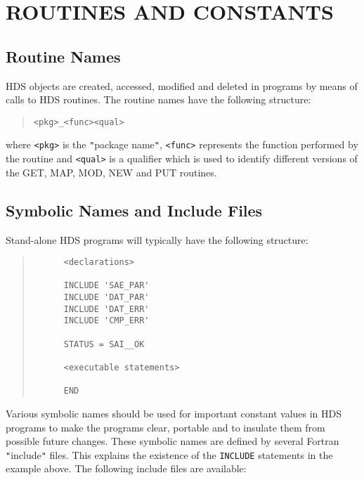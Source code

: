 \documentclass[11pt]{article}
\newcommand{\htmlref}[2]{#1}
\newcommand{\xlabel}[1]{}
\newcommand{\hi}[1]{{\tt{#1}}}
\newcommand{\qt}[1]{``#1''}
\renewcommand{\qt}[1]{{\tt{"}}#1{\tt{"}}}
\begin{document}
\section{\xlabel{routines_and_constants}ROUTINES AND CONSTANTS}

\subsection{Routine Names}

HDS objects are created, accessed, modified and deleted in programs by
means of calls to HDS \htmlref{routines}{appendix:alphalist}. The
routine names have the following structure:

\small
\begin{quote}
\begin{verbatim}
<pkg>_<func><qual>
\end{verbatim}
\end{quote}
\normalsize

where \verb+<pkg>+ is the \qt{package name}, \verb+<func>+ represents
the function performed by the routine and \verb+<qual>+ is a qualifier
which is used to identify different versions of the GET, MAP, MOD, NEW
and PUT routines.

\subsection{Symbolic Names and Include Files}

Stand-alone HDS programs will typically have the following structure:

\small
\begin{quote}
\begin{verbatim}
      <declarations>

      INCLUDE 'SAE_PAR'
      INCLUDE 'DAT_PAR'
      INCLUDE 'DAT_ERR'
      INCLUDE 'CMP_ERR'

      STATUS = SAI__OK

      <executable statements>

      END
\end{verbatim}
\end{quote}
\normalsize

Various symbolic names should be used for important constant values in
HDS programs to make the programs clear, portable and to insulate them
from possible future changes. These symbolic names are defined by
several Fortran \qt{include} files.  This explains the existence of
the \hi{INCLUDE} statements in the example above. The following
include files are available:
\end{document}
